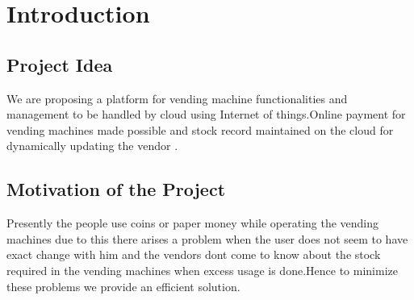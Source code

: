 \documentclass[oneside,a4paper,12pt]{report}
\begin{document}
\chapter{Introduction}
\section{Project Idea}

 We are proposing a platform for vending machine functionalities and management to be  handled by cloud using Internet of things.Online payment for vending machines made possible and stock record maintained on the cloud for dynamically updating the vendor .


\section{Motivation of the Project}  

 Presently the people use coins or paper money while operating the vending machines due to this there arises a problem when the user does not seem to have exact change with him and the vendors dont come to know about the stock required in the vending machines when excess usage is done.Hence to minimize these problems we provide an efficient solution.
\end{document}
